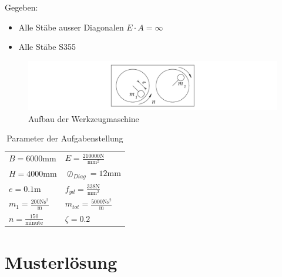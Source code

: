 \documentclass[
  letterpaper,
  DIV=11]{scrreprt}
\providecommand{\tightlist}{%
  \setlength{\itemsep}{0pt}\setlength{\parskip}{0pt}}\usepackage{longtable,booktabs,array}
\begin{document}
Gegeben:

\begin{itemize}
\tightlist
\item
  Alle Stäbe ausser Diagonalen \(E\cdot A = \infty\)
\item
  Alle Stäbe S355
\end{itemize}

\begin{figure}[H]

{\centering \includegraphics{index_files/mediabag/bilder/aufgabe_ems_werkzeugmaschine.pdf}

}

\caption{\label{fig-ems_ges_maschine}Aufbau der Werkzeugmaschine}

\end{figure}

\hypertarget{tbl-parameter_gesamt_dampf}{}
\begin{longtable}[]{@{}
  >{\raggedright\arraybackslash}p{}
  >{\raggedright\arraybackslash}p{}@{}}
\caption{\label{tbl-parameter_gesamt_dampf}Parameter der
Aufgabenstellung}\tabularnewline
\toprule\noalign{}
\endfirsthead
\endhead
\bottomrule\noalign{}
\endlastfoot
\(B = 6000 \text{mm}\) &
\(E = \frac{210000 \text{N}}{\text{mm}^{2}}\) \\
\(H = 4000 \text{mm}\) & \(\oslash_{Diag} = 12 \text{mm}\) \\
\(e = 0.1 \text{m}\) &
\(f_{yd} = \frac{338 \text{N}}{\text{mm}^{2}}\) \\
\(m_{1} = \frac{200 \text{N} \text{s}^{2}}{\text{m}}\) &
\(m_{tot} = \frac{5000 \text{N} \text{s}^{2}}{\text{m}}\) \\
\(n = \frac{150}{\text{minute}}\) & \(\zeta = 0.2\) \\
\end{longtable}

\newpage{}

\hypertarget{musterluxf6sung-5}{%
\section{Musterlösung}\label{musterluxf6sung-5}}
\end{document}
